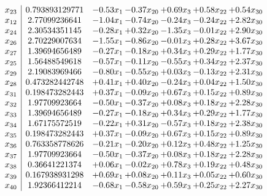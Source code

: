 \documentclass[8pt]{article}
\begin{document}
\[\begin{array}{c| c c@{\hskip 2pt} c@{\hskip 2pt} c@{\hskip 2pt} c@{\hskip 2pt} c@{\hskip 2pt} }
 x_{23}   &  0.793893129771 & -0.53 x_{1} & -0.37 x_{20} & +  0.69 x_{3} & +  0.58 x_{22} & +  0.54 x_{30}\\
 x_{12}   &  2.77099236641 & -1.04 x_{1} & -0.74 x_{20} & -0.24 x_{3} & -0.24 x_{22} & +  2.82 x_{30}\\
 x_{24}   &  2.30534351145 & -0.28 x_{1} & +  0.32 x_{20} & -1.35 x_{3} & -0.01 x_{22} & +  2.90 x_{30}\\
 x_{26}   &  2.70229007634 & -1.55 x_{1} & -0.86 x_{20} & -0.01 x_{3} & +  0.28 x_{22} & +  3.67 x_{30}\\
 x_{27}   &  1.39694656489 & -0.27 x_{1} & -0.18 x_{20} & +  0.34 x_{3} & +  0.29 x_{22} & +  1.77 x_{30}\\
 x_{25}   &  1.56488549618 & -0.57 x_{1} & -0.11 x_{20} & -0.55 x_{3} & +  0.34 x_{22} & +  2.37 x_{30}\\
 x_{29}   &  2.19083969466 & -0.80 x_{1} & -0.55 x_{20} & +  0.03 x_{3} & -0.13 x_{22} & +  2.31 x_{30}\\
 x_{28}   &  0.473282442748 & +  0.41 x_{1} & +  0.40 x_{20} & -0.24 x_{3} & +  0.04 x_{22} & +  1.50 x_{30}\\
 x_{31}   &  0.198473282443 & +  0.37 x_{1} & -0.09 x_{20} & +  0.67 x_{3} & +  0.15 x_{22} & +  0.89 x_{30}\\
 x_{32}   &  1.97709923664 & -0.50 x_{1} & -0.37 x_{20} & +  0.08 x_{3} & +  0.18 x_{22} & +  2.28 x_{30}\\
 x_{33}   &  1.39694656489 & -0.27 x_{1} & -0.18 x_{20} & +  0.34 x_{3} & +  0.29 x_{22} & +  1.77 x_{30}\\
 x_{34}   &  1.67175572519 & -0.22 x_{1} & +  0.31 x_{20} & -0.57 x_{3} & +  0.18 x_{22} & +  2.38 x_{30}\\
 x_{35}   &  0.198473282443 & +  0.37 x_{1} & -0.09 x_{20} & +  0.67 x_{3} & +  0.15 x_{22} & +  0.89 x_{30}\\
 x_{36}   &  0.763358778626 & -0.21 x_{1} & -0.20 x_{20} & +  0.12 x_{3} & +  0.48 x_{22} & +  1.25 x_{30}\\
 x_{37}   &  1.97709923664 & -0.50 x_{1} & -0.37 x_{20} & +  0.08 x_{3} & +  0.18 x_{22} & +  2.28 x_{30}\\
 x_{38}   &  0.36641221374 & +  0.06 x_{1} & -0.02 x_{20} & +  0.78 x_{3} & +  0.19 x_{22} & +  0.48 x_{30}\\
 x_{39}   &  0.167938931298 & +  0.69 x_{1} & +  0.08 x_{20} & +  0.11 x_{3} & +  0.05 x_{22} & +  0.60 x_{30}\\
 x_{40}   &  1.92366412214 & -0.68 x_{1} & -0.58 x_{20} & +  0.59 x_{3} & +  0.25 x_{22} & +  2.27 x_{30}\\

\end{array}\]
\end{document}
